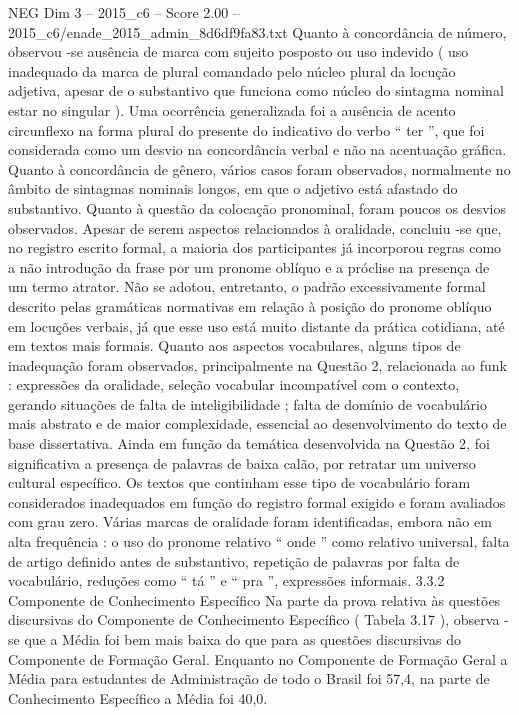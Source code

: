 \begin{textsample}{NEG Dim 3 – 2015\_c6 – Score 2.00 – 2015\_c6/enade\_2015\_admin\_8d6df9fa83.txt}
Quanto à concordância de número, observou -se ausência de marca com sujeito posposto ou uso indevido ( uso inadequado da marca de plural comandado pelo núcleo plural da locução adjetiva, apesar de o substantivo que funciona como núcleo do sintagma nominal estar no singular ).
Uma ocorrência generalizada foi a ausência de acento circunflexo na forma plural do presente do indicativo do verbo “ ter ”, que foi considerada como um desvio na concordância verbal e não na acentuação gráfica.
Quanto à concordância de gênero, vários casos foram observados, normalmente no âmbito de sintagmas nominais longos, em que o adjetivo está afastado do substantivo.
Quanto à questão da colocação pronominal, foram poucos os desvios observados.
Apesar de serem aspectos relacionados à oralidade, concluiu -se que, no registro escrito formal, a maioria dos participantes já incorporou regras como a não introdução da frase por um pronome oblíquo e a próclise na presença de um termo atrator.
Não se adotou, entretanto, o padrão excessivamente formal descrito pelas gramáticas normativas em relação à posição do pronome oblíquo em locuções verbais, já que esse uso está muito distante da prática cotidiana, até em textos mais formais.
Quanto aos aspectos vocabulares, alguns tipos de inadequação foram observados, principalmente na Questão 2, relacionada ao funk : expressões da oralidade, seleção vocabular incompatível com o contexto, gerando situações de falta de inteligibilidade ; falta de domínio de vocabulário mais abstrato e de maior complexidade, essencial ao desenvolvimento do texto de base dissertativa.
Ainda em função da temática desenvolvida na Questão 2, foi significativa a presença de palavras de baixa calão, por retratar um universo cultural específico.
Os textos que continham esse tipo de vocabulário foram considerados inadequados em função do registro formal exigido e foram avaliados com grau zero.
Várias marcas de oralidade foram identificadas, embora não em alta frequência : o uso do pronome relativo “ onde ” como relativo universal, falta de artigo definido antes de substantivo, repetição de palavras por falta de vocabulário, reduções como “ tá ” e “ pra ”, expressões informais. 3.3.2 Componente de Conhecimento Específico Na parte da prova relativa às questões discursivas do Componente de Conhecimento Específico ( Tabela 3.17 ), observa -se que a Média foi bem mais baixa do que para as questões discursivas do Componente de Formação Geral.
Enquanto no Componente de Formação Geral a Média para estudantes de Administração de todo o Brasil foi 57,4, na parte de Conhecimento Específico a Média foi 40,0.

\end{textsample}
